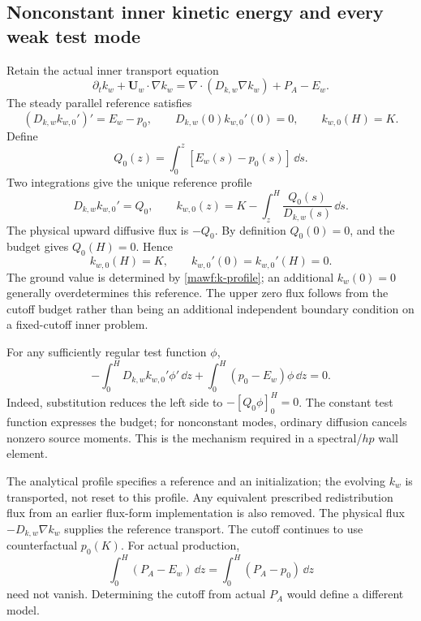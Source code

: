 \subsection{Nonconstant inner kinetic energy and every weak test mode}
\label{mawf:inner-k}
Retain the actual inner transport equation
\begin{equation}
 \partial_tk_w+\bm U_w\cdot\nabla k_w
 =\nabla\cdot(D_{k,w}\nabla k_w)+P_A-E_w.
 \label{mawf:k-transport}
\end{equation}
The steady parallel reference satisfies
\begin{equation}
 (D_{k,w}k_{w,0}')'=E_w-p_0,\qquad
 D_{k,w}(0)k_{w,0}'(0)=0,\qquad k_{w,0}(H)=K.
 \label{mawf:k-bvp}
\end{equation}
Define
\begin{equation}
 Q_0(z)=\int_0^z[E_w(s)-p_0(s)]\,\dd s.
\end{equation}
Two integrations give the unique reference profile
\begin{equation}
 \boxed{
 D_{k,w}k_{w,0}'=Q_0,\qquad
 k_{w,0}(z)=K-\int_z^H\frac{Q_0(s)}{D_{k,w}(s)}\,\dd s.}
 \label{mawf:k-profile}
\end{equation}
The physical upward diffusive flux is \(-Q_0\).
By definition \(Q_0(0)=0\), and the budget gives \(Q_0(H)=0\).
Hence
\begin{equation}
 k_{w,0}(H)=K,\qquad
 k_{w,0}'(0)=k_{w,0}'(H)=0.
 \label{mawf:k-endpoints}
\end{equation}
The ground value is determined by \cref{mawf:k-profile};
an additional \(k_w(0)=0\) generally overdetermines this reference.
The upper zero flux follows from the cutoff budget rather than
being an additional independent boundary condition on a fixed-cutoff
inner problem.

For any sufficiently regular test function \(\phi\),
\begin{equation}
 \boxed{
 -\int_0^H D_{k,w}k_{w,0}'\phi'\,\dd z
 +\int_0^H(p_0-E_w)\phi\,\dd z=0.}
 \label{mawf:weak}
\end{equation}
Indeed, substitution reduces the left side to
\(-[Q_0\phi]_0^H=0\). The constant test function expresses the
budget; for nonconstant modes, ordinary diffusion cancels nonzero
source moments. This is the mechanism required in a spectral/\(hp\)
wall element.

The analytical profile specifies a reference and an initialization;
the evolving \(k_w\) is transported, not reset to this profile.
Any equivalent prescribed redistribution flux from an earlier
flux-form implementation is also removed. The physical flux
\(-D_{k,w}\nabla k_w\) supplies the reference transport.
The cutoff continues to use counterfactual \(p_0(K)\).
For actual production,
\begin{equation}
 \int_0^H(P_A-E_w)\,\dd z=\int_0^H(P_A-p_0)\,\dd z
 \label{mawf:actual-budget}
\end{equation}
need not vanish. Determining the cutoff from actual \(P_A\)
would define a different model.

